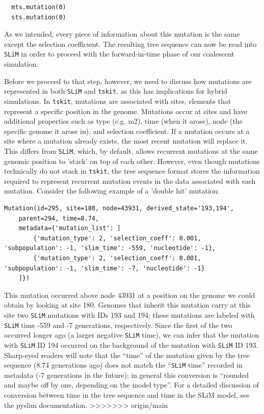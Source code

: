 \documentclass[12pt]{article}
\newcommand{\tskit}[0]{\texttt{tskit}\xspace}
\newcommand{\slim}[0]{\texttt{SLiM}\xspace}
\begin{document}
\begin{listing}[H]
  \begin{verbatim}
  mts.mutation(0)
  sts.mutation(0)
  \end{verbatim}
\end{listing}

As we intended, every piece of information about this mutation is the same except the selection coefficient. The resulting tree
sequence can now be read into \slim in order to proceed with the forward-in-time phase of our coalescent simulation.

Before we proceed to that step, however, we need to discuss how mutations are represented in both \slim and \tskit, as this has
implications for hybrid simulations. In \tskit, mutations are associated with sites, elements that represent a specific
position in the genome. Mutations occur at sites and have additional properties such as type (e.g. m2), time (when it arose),
node (the specific genome it arose in), and selection coefficient. If a mutation occurs at a site where a mutation already exists,
the most recent mutation will replace it. This differs from \slim, which, by default, allows recurrent mutations at the same genomic
position to 'stack' on top of each other. However, even though mutations technically do not stack in \tskit, the tree sequence
format stores the information required to represent recurrent mutation events in the data associated with each mutation.
Consider the following example of a 'double hit' mutation:

\begin{listing}[H]
    \begin{verbatim}
Mutation(id=295, site=180, node=43931, derived_state='193,194',
    parent=294, time=8.74,
    metadata={'mutation_list': [
        {'mutation_type': 2, 'selection_coeff': 0.001, 'subpopulation': -1, 'slim_time': -559, 'nucleotide': -1},
        {'mutation_type': 2, 'selection_coeff': 0.001, 'subpopulation': -1, 'slim_time': -7, 'nucleotide': -1}
    ]})
    \end{verbatim}
\end{listing}

This mutation occurred
above node 43931 at a position on the genome we could obtain by looking at site 180.
Genomes that inherit this mutation carry at this site two \slim mutations with IDs 193 and 194;
these mutations are labeled with \slim time -559 and -7 generations, respectively.
Since the first of the two occurred longer ago (a larger negative \slim time),
we can infer that the mutation with \slim ID 194 occurred on the background
of the mutation with \slim ID 193.
Sharp-eyed readers will note that the ``time'' of the mutation given by the tree sequence
(8.74 generations ago) does not match the ``\slim time'' recorded in metadata
(-7 generations in the future);
in general this conversion is ``rounded and maybe off by one, depending on the model type''.
For a detailed discussion of conversion between time in the tree sequence
and time in the SLiM model, see the pyslim documentation.
>>>>>>> origin/main
\end{document}
